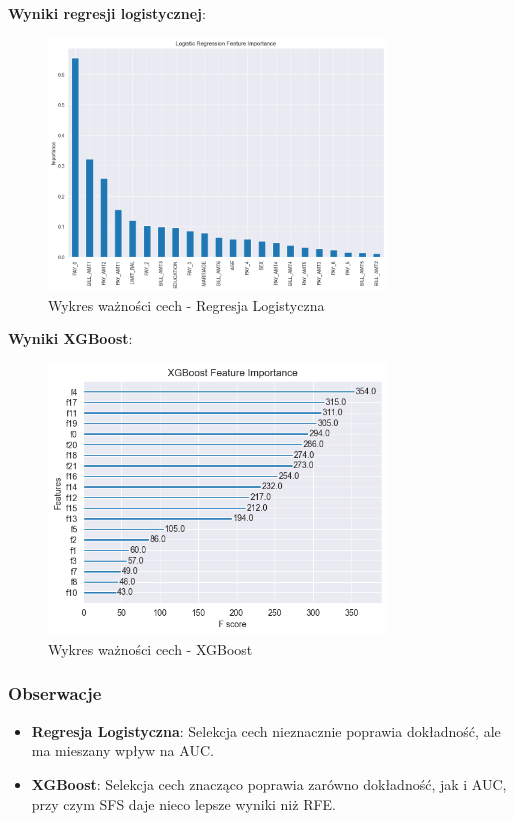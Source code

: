 \documentclass{article}
\begin{document}
\textbf{Wyniki regresji logistycznej}:
\begin{figure}[H]
    \centering
    \includegraphics[width=0.8\textwidth]{./lr_importance.png}
    \caption{Wykres ważności cech - Regresja Logistyczna}
    \label{fig:lr_feature_importance}
\end{figure}

\textbf{Wyniki XGBoost}:
\begin{figure}[H]
    \centering
    \includegraphics[width=0.8\textwidth]{./xgb_importance.png}
    \caption{Wykres ważności cech - XGBoost}
    \label{fig:xgb_feature_importance}
\end{figure}


\subsubsection{Obserwacje}
\begin{itemize}
    \item \textbf{Regresja Logistyczna}: Selekcja cech nieznacznie poprawia dokładność, ale ma mieszany wpływ na AUC.
    \item \textbf{XGBoost}: Selekcja cech znacząco poprawia zarówno dokładność, jak i AUC, przy czym SFS daje nieco lepsze wyniki niż RFE.
\end{itemize}
\end{document}
